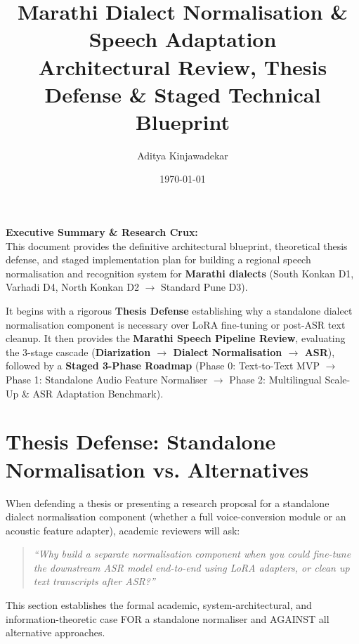 \documentclass[11pt]{article}
\title{\textbf{Marathi Dialect Normalisation \& Speech Adaptation \\\medskip\large Architectural Review, Thesis Defense \& Staged Technical Blueprint}}
\author{Aditya Kinjawadekar}
\date{\today}
\begin{document}
\maketitle

\begin{infobox}
\textbf{Executive Summary \& Research Crux:} \\
This document provides the definitive architectural blueprint, theoretical thesis defense, and staged implementation plan for building a regional speech normalisation and recognition system for \textbf{Marathi dialects} (South Konkan D1, Varhadi D4, North Konkan D2 $\rightarrow$ Standard Pune D3). 

It begins with a rigorous \textbf{Thesis Defense} establishing why a standalone dialect normalisation component is necessary over LoRA fine-tuning or post-ASR text cleanup. It then provides the \textbf{Marathi Speech Pipeline Review}, evaluating the 3-stage cascade (\textbf{Diarization $\rightarrow$ Dialect Normalisation $\rightarrow$ ASR}), followed by a \textbf{Staged 3-Phase Roadmap} (Phase 0: Text-to-Text MVP $\rightarrow$ Phase 1: Standalone Audio Feature Normaliser $\rightarrow$ Phase 2: Multilingual Scale-Up \& ASR Adaptation Benchmark).
\end{infobox}

\section{Thesis Defense: Standalone Normalisation vs. Alternatives}

When defending a thesis or presenting a research proposal for a standalone dialect normalisation component (whether a full voice-conversion module or an acoustic feature adapter), academic reviewers will ask:
\begin{quote}
\textit{``Why build a separate normalisation component when you could fine-tune the downstream ASR model end-to-end using LoRA adapters, or clean up text transcripts after ASR?''}
\end{quote}
This section establishes the formal academic, system-architectural, and information-theoretic case FOR a standalone normaliser and AGAINST all alternative approaches.
\end{document}
